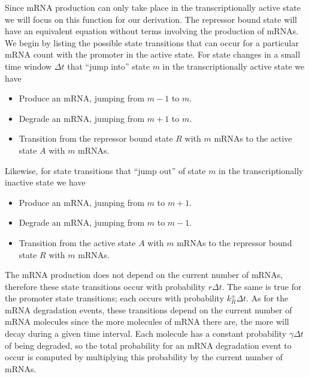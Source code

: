 Since mRNA production can only take place in the transcriptionally active state
we will focus on this function for our derivation. The repressor bound state
will have an equivalent equation without terms involving the production of
mRNAs. We begin by listing the possible state transitions that can occur for a
particular mRNA count with the promoter in the active state. For state changes
in a small time window $\Delta t$ that ``jump into'' state $m$ in the
transcriptionally active state we have
\begin{itemize}
    \item Produce an mRNA, jumping from $m-1$ to $m$.
    \item Degrade an mRNA, jumping from $m+1$ to $m$.
    \item Transition from the repressor bound state $R$ with $m$ mRNAs  to the
    active state $A$ with $m$ mRNAs.
\end{itemize}
Likewise, for state transitions that ``jump out'' of state $m$ in the
transcriptionally inactive state we have
\begin{itemize}
    \item Produce an mRNA, jumping from $m$ to $m+1$.
    \item Degrade an mRNA, jumping from $m$ to $m-1$.
    \item Transition from the active state $A$ with $m$ mRNAs to the repressor
    bound state $R$ with $m$ mRNAs.
\end{itemize}
The mRNA production does not depend on the current number of mRNAs, therefore
these state transitions occur with probability $r\Delta t$. The same is true for
the promoter state transitions; each occurs with probability $k_R^\pm \Delta t$.
As for the mRNA degradation events, these transitions depend on the current
number of mRNA molecules since the more molecules of mRNA there are, the more
will decay during a given time interval. Each molecule has a constant
probability $\gamma \Delta t$ of being degraded, so the total probability for an
mRNA degradation event to occur is computed by multiplying this probability by
the current number of mRNAs.

